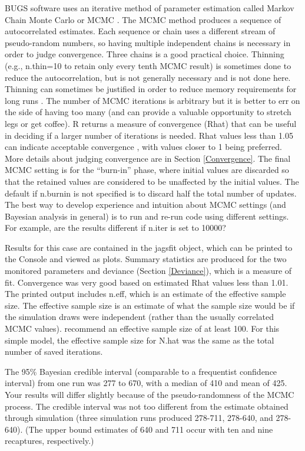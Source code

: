 \documentclass[
]{krantz}
\begin{document}
BUGS software uses an iterative method of parameter estimation called Markov Chain Monte Carlo or MCMC \citep{mccarthy2007}. The MCMC method produces a sequence of autocorrelated estimates. Each sequence or chain uses a different stream of pseudo-random numbers, so having multiple independent chains is necessary in order to judge convergence. Three chains is a good practical choice. Thinning (e.g., n.thin=10 to retain only every tenth MCMC result) is sometimes done to reduce the autocorrelation, but is not generally necessary \citep{link.eaton2012} and is not done here. Thinning can sometimes be justified in order to reduce memory requirements for long runs \citep{gelman.hill_2006}. The number of MCMC iterations is arbitrary but it is better to err on the side of having too many (and can provide a valuable opportunity to stretch legs or get coffee). R returns a measure of convergence (Rhat) that can be useful in deciding if a larger number of iterations is needed. Rhat values less than 1.05 can indicate acceptable convergence \citep{lunn.etal2012}, with values closer to 1 being preferred. More details about judging convergence are in Section \ref{Convergence}. The final MCMC setting is for the ``burn-in'' phase, where initial values are discarded so that the retained values are considered to be unaffected by the initial values. The default if n.burnin is not specified is to discard half the total number of updates. The best way to develop experience and intuition about MCMC settings (and Bayesian analysis in general) is to run and re-run code using different settings. For example, are the results different if n.iter is set to 10000?

Results for this case are contained in the jagsfit object, which can be printed to the Console and viewed as plots. Summary statistics are produced for the two monitored parameters and deviance (Section \ref{Deviance}), which is a measure of fit. Convergence was very good based on estimated Rhat values less than 1.01. The printed output includes n.eff, which is an estimate of the effective sample size. The effective sample size is an estimate of what the sample size would be if the simulation draws were independent (rather than the usually correlated MCMC values). \citet{gelman.hill_2006} recommend an effective sample size of at least 100. For this simple model, the effective sample size for N.hat was the same as the total number of saved iterations.

The 95\% Bayesian credible interval (comparable to a frequentist confidence interval) from one run was 277 to 670, with a median of 410 and mean of 425. Your results will differ slightly because of the pseudo-randomness of the MCMC process. The credible interval was not too different from the estimate obtained through simulation (three simulation runs produced 278-711, 278-640, and 278-640). (The upper bound estimates of 640 and 711 occur with ten and nine recaptures, respectively.)
\end{document}

